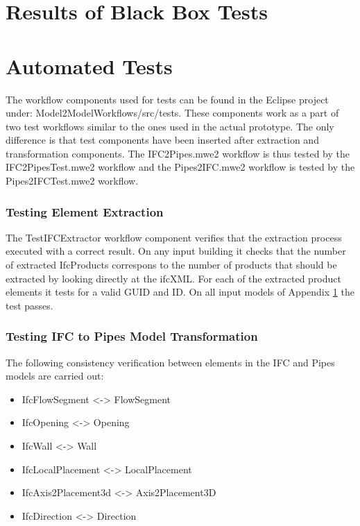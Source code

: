\newpage
\appendix
\section{Results of Black Box Tests}
\label{app:blackboxtests}


\section{Automated Tests}
\label{app:automatedtests}
The workflow components used for tests can be found in the Eclipse project under: Model2ModelWorkflows/src/tests. These components work as a part of two test workflows similar to the ones used in the actual prototype. The only difference is that test components have been inserted after extraction and transformation components. The IFC2Pipes.mwe2 workflow is thus tested by the IFC2PipesTest.mwe2 workflow and the Pipes2IFC.mwe2 workflow is tested by the Pipes2IFCTest.mwe2 workflow.

\subsubsection{Testing Element Extraction}
The TestIFCExtractor workflow component verifies that the extraction process executed with a correct result. On any input building it checks that the number of extracted IfcProducts correspons to the number of products that should be extracted by looking directly at the ifcXML. For each of the extracted product elements it tests for a valid GUID and ID. On all input models of Appendix \ref{app:blackboxtests} the test passes.

\subsubsection{Testing IFC to Pipes Model Transformation}
The following consistency verification between elements in the IFC and Pipes models are carried out:

\begin{itemize}
	\item IfcFlowSegment <-> FlowSegment
	\item IfcOpening <-> Opening
	\item IfcWall <-> Wall
	\item IfcLocalPlacement <-> LocalPlacement
	\item IfcAxis2Placement3d <-> Axis2Placement3D
	\item IfcDirection <-> Direction
\end{itemize}

